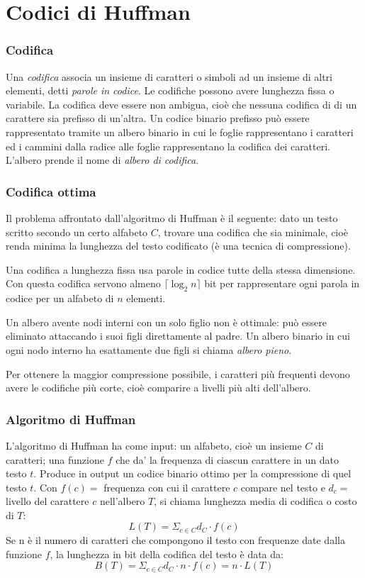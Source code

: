\documentclass[11pt]{book}
\begin{document}
\section{Codici di Huffman}
\subsubsection{Codifica}
Una \textit{codifica} associa un insieme di caratteri o simboli ad un insieme di altri elementi, detti \textit{parole in codice}.
Le codifiche possono avere lunghezza fissa o variabile. La codifica deve essere non ambigua, cioè che nessuna codifica di 
di un carattere sia prefisso di un'altra. Un codice binario prefisso può essere rappresentato tramite un albero binario 
in cui le foglie rappresentano i caratteri ed i cammini dalla radice alle foglie rappresentano la codifica dei caratteri. 
L'albero prende il nome di \textit{albero di codifica}.
\subsubsection{Codifica ottima}
Il problema affrontato dall'algoritmo di Huffman è il seguente: dato un testo scritto secondo un certo alfabeto $C$, trovare 
una codifica che sia minimale, cioè renda minima la lunghezza del testo codificato (è una tecnica di compressione). 

Una codifica a lunghezza fissa usa parole in codice tutte della stessa dimensione. Con questa codifica servono almeno 
$\lceil \log_2 n\rceil$ bit per rappresentare ogni parola in codice per un alfabeto di $n$ elementi.

Un albero avente nodi interni con un solo figlio non è ottimale: può essere eliminato attaccando i suoi figli direttamente 
al padre. Un albero binario in cui ogni nodo interno ha esattamente due figli si chiama \textit{albero pieno}.

Per ottenere la maggior compressione possibile, i caratteri più frequenti devono avere le codifiche più corte, cioè comparire 
a livelli più alti dell'albero.
\subsubsection{Algoritmo di Huffman}
L'algoritmo di Huffman ha come input: un alfabeto, cioè un insieme $C$ di caratteri; una funzione $f$ che da' la frequenza 
di ciascun carattere in un dato testo $t$.
Produce in output un codice binario ottimo per la compressione di quel testo $t$.
Con $f(c)=$ frequenza con cui il carattere $c$ compare nel testo e $d_c=$ livello del carattere $c$ nell'albero $T$, si 
chiama lunghezza media di codifica o costo di $T$:
\begin{equation*}
    L(T)=\Sigma_{c\in C}d_C\cdot f(c)
\end{equation*}
Se n è il numero di caratteri che compongono il testo con frequenze date dalla funzione $f$, la lunghezza in bit della 
codifica del testo è data da:
\begin{equation*}
    B(T)=\Sigma_{c\in C}d_C\cdot n\cdot f(c)=n\cdot L(T)
\end{equation*}
\end{document}
